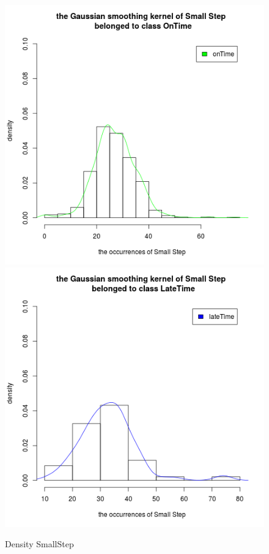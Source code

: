 \documentclass[a4paper, 13pt]{report}
\begin{document}
\begin{figure}[!htb]
  \includegraphics[width=\linewidth]{DensitySmallStep_OnTime}
\endminipage
{}
  \includegraphics[width=\linewidth]{DensitySmallStep_LateTime}
\endminipage
\caption*{Density SmallStep}
\end{figure}
\end{document}
